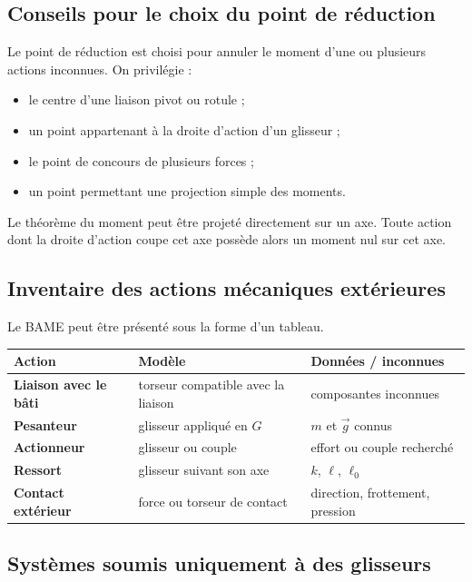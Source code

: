 \subsection{Conseils pour le choix du point de réduction}

Le point de réduction est choisi pour annuler le moment d'une ou plusieurs actions inconnues. On privilégie :
\begin{itemize}
  \item le centre d'une liaison pivot ou rotule ;
  \item un point appartenant à la droite d'action d'un glisseur ;
  \item le point de concours de plusieurs forces ;
  \item un point permettant une projection simple des moments.
\end{itemize}

Le théorème du moment peut être projeté directement sur un axe. Toute action dont la droite d'action coupe cet axe possède alors un moment nul sur cet axe.

\subsection{Inventaire des actions mécaniques extérieures}

Le BAME peut être présenté sous la forme d'un tableau.

\begin{center}
\begin{tabularx}{\linewidth}{>{\bfseries}l X X}
\toprule
Action & Modèle & Données / inconnues \\
\midrule
Liaison avec le bâti & torseur compatible avec la liaison & composantes inconnues \\
Pesanteur & glisseur appliqué en $G$ & $m$ et $\vec g$ connus \\
Actionneur & glisseur ou couple & effort ou couple recherché \\
Ressort & glisseur suivant son axe & $k$, $\ell$, $\ell_0$ \\
Contact extérieur & force ou torseur de contact & direction, frottement, pression \\
\bottomrule
\end{tabularx}
\end{center}

\subsection{Systèmes soumis uniquement à des glisseurs}

